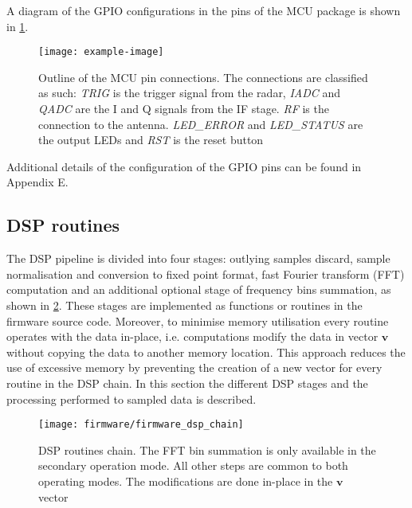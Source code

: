A diagram of the GPIO configurations in the pins of the MCU package is shown in \cref{fig:firmware_gpio}.




\begin{figure}[ht]
	\centering
	\texttt{[image: example-image]}
	\caption{Outline of the MCU pin connections. The connections are classified as such: \textit{TRIG} is the trigger signal from the radar, \textit{IADC} and \textit{QADC} are the I and Q signals from the IF stage. \textit{RF} is the connection to the antenna. \textit{LED\_ERROR} and \textit{LED\_STATUS} are the output LEDs and \textit{RST} is the reset button}
	\label{fig:firmware_gpio}
\end{figure}

Additional details of the configuration of the GPIO pins can be found in Appendix E. %

\subsection{DSP routines} \label{sec:dsp_routines}

The DSP pipeline is divided into four stages: outlying samples discard, sample normalisation and conversion to fixed point format, fast Fourier transform (FFT) computation and an additional optional stage of frequency bins summation, as shown in \cref{fig:firmware_dsp_chain}. These stages are implemented as functions or routines in the firmware source code. Moreover, to minimise memory utilisation every routine operates with the data in-place, i.e. computations modify the data in vector $\mathbf{v}$ without copying the data to another memory location. This approach reduces the use of excessive memory by preventing the creation of a new vector for every routine in the DSP chain. In this section the different DSP stages and the processing performed to sampled data is described.

\begin{figure}[ht]
	\centering
	\texttt{[image: firmware/firmware\_dsp\_chain]}
	\caption{DSP routines chain. The FFT bin summation is only available in the secondary operation mode. All other steps are common to both operating modes. The modifications are done in-place in the $\mathbf{v}$ vector}
	\label{fig:firmware_dsp_chain}
\end{figure}

